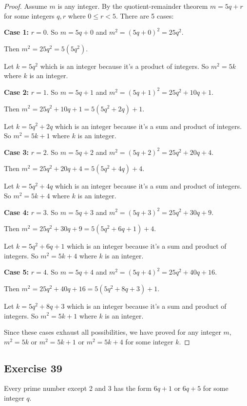 \documentclass[14pt]{extarticle}
\begin{document}
\begin{proof}
Assume $m$ is any integer. By the quotient-remainder theorem $m = 5q+r$ for some integers $q,r$ where $0 \leq r < 5$. There are 5 cases:

{\bf Case 1:} $r = 0$. So $m = 5q + 0$ and $m^2 = (5q+0)^2 = 25q^2$.

Then $m^2 = 25q^2 = 5(5q^2)$.

Let $k = 5q^2$ which is an integer because it's a product of integers. So $m^2 = 5k$ where $k$ is an integer.

{\bf Case 2:} $r = 1$. So $m = 5q + 1$ and $m^2 = (5q + 1)^2 = 25q^2 + 10q + 1$.

Then $m^2 = 25q^2 + 10q + 1 = 5(5q^2+2q)+1$.

Let $k = 5q^2+2q$ which is an integer because it's a sum and product of integers. So $m^2 = 5k + 1$ where $k$ is an integer.

{\bf Case 3:} $r = 2$. So $m = 5q + 2$ and $m^2 = (5q + 2)^2 = 25q^2 + 20q + 4$.

Then $m^2 = 25q^2 + 20q + 4 = 5(5q^2+4q)+4$.

Let $k = 5q^2+4q$ which is an integer because it's a sum and product of integers. So $m^2 = 5k +4$ where $k$ is an integer.

{\bf Case 4:} $r = 3$. So $m = 5q + 3$ and $m^2 = (5q + 3)^2 = 25q^2 + 30q+9$.

Then $m^2 = 25q^2 + 30q+9 = 5(5q^2+6q+1)+4$.

Let $k = 5q^2+6q+1$ which is an integer because it's a sum and product of integers. So $m^2 = 5k + 4$ where $k$ is an integer.

{\bf Case 5:} $r = 4$. So $m = 5q + 4$ and $m^2 = (5q + 4)^2 = 25q^2 + 40q + 16$.

Then $m^2 = 25q^2 + 40q + 16 = 5(5q^2+8q+3)+1$.

Let $k = 5q^2+8q+3$ which is an integer because it's a sum and product of integers. So $m^2 = 5k + 1$ where $k$ is an integer.

Since these cases exhaust all possibilities, we have proved for any integer $m$, $m^2 = 5k$ or $m^2 = 5k+1$ or $m^2 = 5k+4$ for some integer $k$.
\end{proof}

\subsection{Exercise 39}
Every prime number except 2 and 3 has the form $6q + 1$ or $6q + 5$ for some integer $q$.
\end{document}
